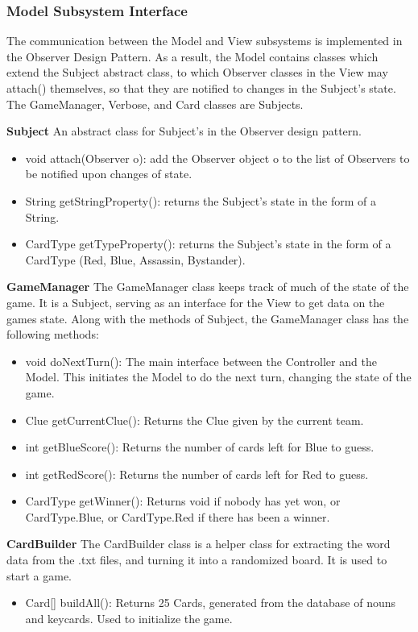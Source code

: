 \subsubsection {Model Subsystem Interface}
The communication between the Model and View subsystems is implemented in the Observer Design Pattern. As a result, the Model contains classes which extend the Subject abstract class, to which Observer classes in the View may attach() themselves, so that they are notified to changes in the Subject's state. The GameManager, Verbose, and Card classes are Subjects.

\textbf{Subject} An abstract class for Subject's in the Observer design pattern.
\begin{itemize}
  \item void attach(Observer o): add the Observer object o to the list of Observers to be notified upon changes of state.
  \item String getStringProperty(): returns the Subject's state in the form of a String.
  \item CardType getTypeProperty(): returns the Subject's state in the form of a CardType (Red, Blue, Assassin, Bystander).
\end{itemize}

\textbf{GameManager} The GameManager class keeps track of much of the state of the game. It is a Subject, serving as an interface for the View to get data on the games state. Along with the methods of Subject, the GameManager class has the following methods:
\begin{itemize}
  \item void doNextTurn(): The main interface between the Controller and the Model. This initiates the Model to do the next turn, changing the state of the game.
  \item Clue getCurrentClue(): Returns the Clue given by the current team.
  \item int getBlueScore(): Returns the number of cards left for Blue to guess.
  \item int getRedScore(): Returns the number of cards left for Red to guess.
  \item CardType getWinner(): Returns void if nobody has yet won, or CardType.Blue, or CardType.Red if there has been a winner.
\end{itemize}

\textbf{CardBuilder} The CardBuilder class is a helper class for extracting the word data from the .txt files, and turning it into a randomized board. It is used to start a game.
\begin{itemize}
  \item Card[] buildAll(): Returns 25 Cards, generated from the database of nouns and keycards. Used to initialize the game.
\end{itemize}

